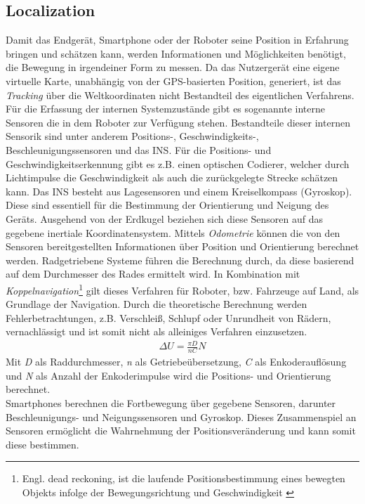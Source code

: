 \subsection{Localization}
Damit das Endgerät, Smartphone oder der Roboter seine Position in Erfahrung bringen und schätzen kann, werden Informationen und Möglichkeiten 
benötigt, die Bewegung in irgendeiner Form zu messen. Da das Nutzergerät eine eigene virtuelle Karte, unabhängig von der \acs{GPS}-basierten 
Position, generiert, ist das \textit{Tracking} über die Weltkoordinaten nicht Bestandteil des eigentlichen Verfahrens. Für die Erfassung der 
internen Systemzustände gibt es sogenannte interne Sensoren die in dem Roboter zur Verfügung stehen. Bestandteile dieser internen 
Sensorik sind unter anderem Positions-, Geschwindigkeits-, Beschleunigungssensoren und das \acl{INS}. Für die Positions- und 
Geschwindigkeitserkennung gibt es z.B. einen optischen Codierer, welcher durch Lichtimpulse die Geschwindigkeit als auch die zurückgelegte 
Strecke schätzen kann. Das \acs{INS} besteht aus Lagesensoren und einem Kreiselkompass (Gyroskop). Diese sind essentiell für die Bestimmung 
der Orientierung und Neigung des Geräts. Ausgehend von der Erdkugel beziehen sich diese Sensoren auf das gegebene inertiale Koordinatensystem.
Mittels \textit{Odometrie} können die von den Sensoren bereitgestellten Informationen über Position und Orientierung berechnet werden. Radgetriebene 
Systeme führen die Berechnung durch, da diese basierend auf dem Durchmesser des Rades ermittelt wird. In Kombination mit \textit{Koppelnavigation}\footnote{Engl. dead reckoning, ist die laufende Positionsbestimmung eines bewegten Objekts infolge der Bewegungsrichtung und Geschwindigkeit \cite{koppelnavigation.2019j}}
gilt dieses Verfahren für Roboter, bzw. Fahrzeuge auf Land, als Grundlage der Navigation. Durch die theoretische Berechnung werden 
Fehlerbetrachtungen, z.B. Verschleiß, Schlupf oder Unrundheit von Rädern, vernachlässigt und ist somit nicht als alleiniges Verfahren einzusetzen. \cite{robotik2.2020m}
\begin{align}
    \Delta U = \frac{\pi D}{\textit{n}C}N
\end{align}
Mit \textit{D} als Raddurchmesser, \textit{n} als Getriebeübersetzung, \textit{C} als Enkoderauflösung und \textit{N} als Anzahl der 
Enkoderimpulse wird die Positions- und Orientierung berechnet. 
\\ 
Smartphones berechnen die Fortbewegung über gegebene Sensoren, darunter Beschleunigungs- und Neigungssensoren und Gyroskop. Dieses Zusammenspiel an 
Sensoren ermöglicht die Wahrnehmung der Positionsveränderung und kann somit diese bestimmen.
